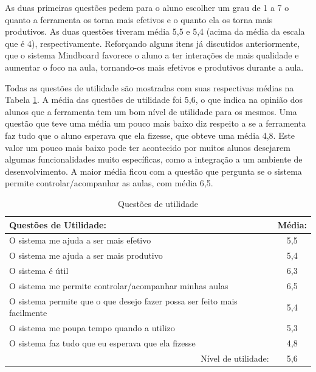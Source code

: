 As duas primeiras questões pedem para o aluno escolher um grau de 1 a 7 o quanto a ferramenta os torna mais efetivos e o quanto ela os torna mais produtivos. As duas questões tiveram média 5,5 e 5,4 (acima da média da escala que é 4), respectivamente. Reforçando alguns itens já discutidos anteriormente, que o sistema Mindboard favorece o aluno a ter interações de mais qualidade e aumentar o foco na aula, tornando-os mais efetivos e produtivos durante a aula.

Todas as questões de utilidade são mostradas com suas respectivas médias na Tabela \ref{tab:use_utilidade}. A média das questões de utilidade foi 5,6, o que indica na opinião dos alunos que a ferramenta tem um bom nível de utilidade para os mesmos. Uma questão que teve uma média um pouco mais baixo diz respeito a se a ferramenta faz tudo que o aluno esperava que ela fizesse, que obteve uma média 4,8. Este valor um pouco mais baixo pode ter acontecido por muitos alunos desejarem algumas funcionalidades muito específicas, como a integração a um ambiente de desenvolvimento. A maior média ficou com a questão que pergunta se o sistema permite controlar/acompanhar as aulas, com média 6,5.

\begin{table}[]
\centering
\caption{Questões de utilidade}
\label{tab:use_utilidade}
\begin{tabular}{@{}|l|c|@{}}
\hline
Questões de Utilidade:                                                   & \multicolumn{1}{l|}{Média:} \\ \hline
O sistema me ajuda a ser mais efetivo                                    & 5,5                         \\ \hline
O sistema me ajuda a ser mais produtivo                                  & 5,4                         \\ \hline
O sistema é útil                                                         & 6,3                            \\ \hline
O sistema me permite controlar/acompanhar minhas aulas                   & 6,5                            \\ \hline
O sistema permite que o que desejo fazer possa ser feito mais facilmente & 5,4                            \\ \hline
O sistema me poupa tempo quando a utilizo                                & 5,3                            \\ \hline
O sistema faz tudo que eu esperava que ela fizesse                       & 4,8                             \\ \hline
\multicolumn{1}{|r|}{Nível de utilidade:}                                & 5,6      \\ \hline
\end{tabular}
\end{table}

